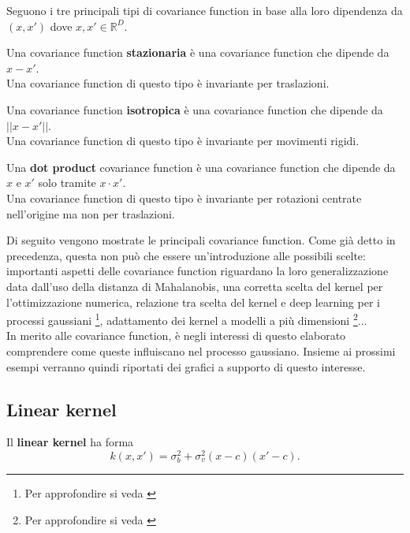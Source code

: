 Seguono i tre principali tipi di covariance function in base alla loro dipendenza da $(x,x')$ dove $x,x'\in \mathbb{R}^D$.




\begin{defi}
Una covariance function \textbf{stazionaria} è una covariance function che dipende da $x-x'$.\\
Una covariance function di questo tipo è invariante per traslazioni.
\end{defi}

\begin{defi}
Una covariance function \textbf{isotropica} è una covariance function che dipende da $||x-x'||$.\\
Una covariance function di questo tipo è invariante per movimenti rigidi.
\end{defi}

\begin{defi}
Una \textbf{dot product} covariance function è una covariance function che dipende da $x$ e $x'$ solo tramite $x\cdot x'$.\\
Una covariance function di questo tipo è invariante per rotazioni centrate nell'origine ma non per traslazioni.
\end{defi}

Di seguito vengono mostrate le principali covariance function. Come già detto in precedenza, questa non può che essere un'introduzione alle possibili scelte: importanti aspetti delle covariance function riguardano la loro generalizzazione data dall'uso della distanza di Mahalanobis, una corretta scelta del kernel per l'ottimizzazione numerica, relazione tra scelta del kernel e deep learning per i processi gaussiani \footnote{Per approfondire si veda \cite{murphy_probabilistic_2022}}, adattamento dei kernel a modelli a più dimensioni \footnote{Per approfondire si veda \cite{duvenaud_automatic_2014}}... \\
In merito alle covariance function, è negli interessi di questo elaborato comprendere come queste influiscano nel processo gaussiano. Insieme ai prossimi esempi verranno quindi riportati dei grafici a supporto di questo interesse.

\newpage

\subsection{Linear kernel}
\begin{defi}
Il \textbf{linear kernel} ha forma \[
k(x,x')=\sigma_b^2+\sigma_v^2 (x-c)(x'-c).
\]
\end{defi}

